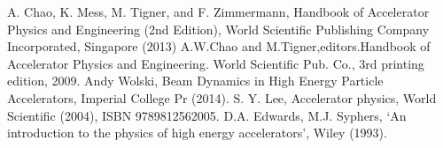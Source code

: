 \documentclass[10pt,a4paper]{ltjsarticle}
\begin{document}
\begin{thebibliography}{9}
    A. Chao, K. Mess, M. Tigner, and F. Zimmermann, Handbook of Accelerator Physics and Engineering (2nd Edition), World Scientific Publishing Company Incorporated, Singapore (2013)
    A.W.Chao and M.Tigner,editors.Handbook of Accelerator Physics and Engineering. World Scientific Pub. Co., 3rd printing edition, 2009.
    Andy Wolski, Beam Dynamics in High Energy Particle Accelerators,  Imperial College Pr (2014).
    S. Y. Lee, Accelerator physics, World Scientific (2004), ISBN 9789812562005.
    D.A. Edwards, M.J. Syphers, `An introduction to the physics of high energy accelerators', Wiley (1993).
\end{thebibliography}
%
\end{document}
